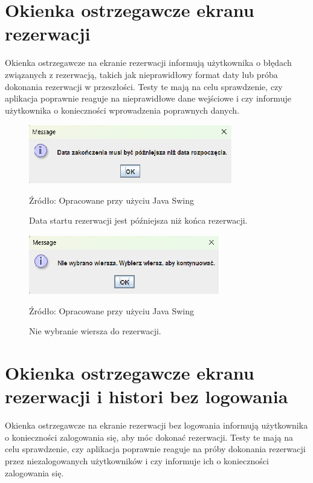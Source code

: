 \section {Okienka ostrzegawcze ekranu rezerwacji}
Okienka ostrzegawcze na ekranie rezerwacji informują użytkownika o błędach związanych z rezerwacją, takich jak nieprawidłowy format daty lub próba dokonania rezerwacji w przeszłości. Testy te mają na celu sprawdzenie, czy aplikacja poprawnie reaguje na nieprawidłowe dane wejściowe i czy informuje użytkownika o konieczności wprowadzenia poprawnych danych.
\begin{figure}[H]
    \centering
    \includegraphics[width=0.8\linewidth]{figures/r4.eps}
    \caption{Data startu rezerwacji jest późniejsza niż końca rezerwacji.}
    \label{fig:reservation_win}
    \small{Źródło: Opracowane przy użyciu Java Swing}
\end{figure}


\begin{figure}[H]
    \centering
    \includegraphics[width=0.8\linewidth]{figures/r5.eps}
    \caption{Nie wybranie wiersza do rezerwacji.}
    \label{fig:reservation_win}
    \small{Źródło: Opracowane przy użyciu Java Swing}   
\end{figure}


\section{Okienka ostrzegawcze ekranu rezerwacji i histori bez logowania}
Okienka ostrzegawcze na ekranie rezerwacji bez logowania informują użytkownika o konieczności zalogowania się, aby móc dokonać rezerwacji. Testy te mają na celu sprawdzenie, czy aplikacja poprawnie reaguje na próby dokonania rezerwacji przez niezalogowanych użytkowników i czy informuje ich o konieczności zalogowania się.


